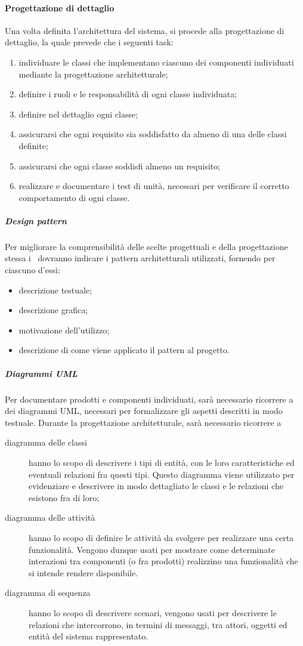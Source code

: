 \documentclass[../NormeProgetto.tex]{subfiles}
\begin{document}
		\paragraph{Progettazione di dettaglio}
			Una volta definita l'architettura del sistema, si procede alla progettazione di dettaglio, la quale prevede che i seguenti task:
			\begin{enumerate}
				\item individuare le classi che implementano ciascuno dei componenti individuati mediante la progettazione architetturale;
				\item definire i ruoli e le responsabilità di ogni classe individuata;
				\item definire nel dettaglio ogni classe;
				\item assicurarsi che ogni requisito sia soddisfatto da almeno di una delle classi definite;
				\item assicurarsi che ogni classe soddisfi almeno un requisito;
				\item realizzare e documentare i test di unità, necessari per verificare il corretto comportamento di ogni classe.
			\end{enumerate}
			
			\subparagraph{Design pattern}
				Per migliorare la comprensibilità delle scelte progettuali e della progettazione stessa i \progettisti\ dovranno indicare i pattern architetturali utilizzati, fornendo per ciascuno d'essi:
				\begin{itemize}
					\item descrizione testuale;
					\item descrizione grafica;
					\item motivazione dell'utilizzo;
					\item descrizione di come viene applicato il pattern al progetto.
				\end{itemize}
			\subparagraph{Diagrammi UML}
				Per documentare prodotti e componenti individuati, sarà necessario ricorrere a dei diagrammi UML, necessari per formalizzare gli aspetti descritti in modo testuale. Durante la progettazione architetturale, sarà necessario ricorrere a 
				\begin{description}
					\item[diagramma delle classi] hanno lo scopo di descrivere i tipi di entità, con le loro caratteristiche ed eventuali relazioni fra questi tipi. Questo diagramma viene utilizzato per evidenziare e descrivere in modo dettagliato le classi e le relazioni che esistono fra di loro;
					\item[diagramma delle attività]  hanno lo scopo di definire le attività da svolgere per realizzare una certa funzionalità. Vengono dunque usati per mostrare come determinate interazioni tra
componenti (o fra prodotti) realizzino una funzionalità che si intende rendere disponibile.
				
					\item[diagramma di sequenza] hanno lo scopo di descrivere scenari, vengono usati per descrivere le relazioni che intercorrono, in termini di messaggi, tra attori, oggetti ed entità del sistema rappresentato.
				\end{description}
			
\end{document}
